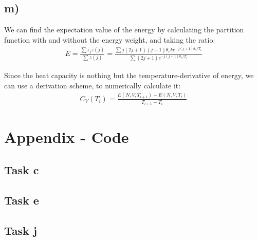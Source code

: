 \documentclass[12p,a4paper]{article}
\renewcommand{\exp}{e^}
\begin{document}
\subsection*{m)}
We can find the expectation value of the energy by calculating the partition function with and without the energy weight, and taking the ratio:
\begin{align*}
    E = \frac{\sum \epsilon_j z(j)}{\sum z(j)} = \frac{\sum j(2j+1)(j+1)\theta_r k\exp{-j(j+1)\theta_r/T_i}}{\sum (2j+1)\exp{-j(j+1)\theta_r/T_i}}
\end{align*}

Since the heat capacity is nothing but the temperature-derivative of energy, we can use a derivation scheme, to numerically calculate it:
\begin{align*}
    C_V(T_i) = \frac{E(N, V, T_{i+1}) - E(N, V, T_i)}{T_{i+1} - T_i}
\end{align*}


\section*{Appendix - Code}
\subsection*{Task c}

\subsection*{Task e}

\newpage
\subsection*{Task j}

\end{document}
